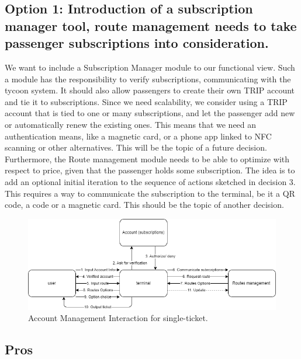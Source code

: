 \subsection*{Option 1: Introduction of a subscription manager tool, route management needs to take passenger subscriptions into consideration.}
We want to include a Subscription Manager module to our functional view. 
Such a module has the responsibility to verify subscriptions, communicating with the tycoon system.
It should also allow passengers to create their own TRIP account and tie it to subscriptions.
Since we need scalability, we consider using a TRIP account that is tied to one or many subscriptions, and let the passenger add new or automatically renew the existing ones.
This means that we need an authentication means, like a magnetic card, or a phone app linked to NFC scanning or other alternatives.
This will be the topic of a future decision.
Furthermore, the Route management module needs to be able to optimize with respect to price, given that the passenger holds some subscription.
The idea is to add an optional initial iteration to the sequence of actions sketched in decision 3.
This requires a way to communicate the subscription to the terminal, be it a QR code, a code or a magnetic card. 
This should be the topic of another decision.
\begin{figure}[ht]
    \centering
    \includegraphics[width=\textwidth]{drawings/decision4_drawings/account_functional.png}
    \caption{Account Management Interaction for single-ticket.}
    \label{fig:account_management_ticket}
\end{figure}
\subsection*{Pros}

